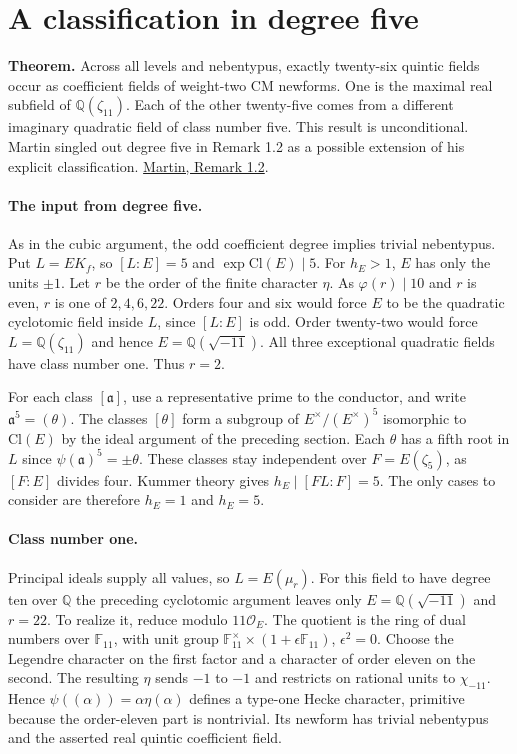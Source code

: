 \section{A classification in degree five}
\label{sec:quintic}

\textbf{Theorem.} Across all levels and nebentypus, exactly twenty-six
quintic fields occur as coefficient fields of weight-two CM newforms.
One is the maximal real subfield of $\mathbb Q(\zeta_{11})$. Each of
the other twenty-five comes from a different imaginary quadratic field
of class number five. This result is unconditional. Martin singled out
degree five in Remark 1.2 as a possible extension of his explicit
classification. \href{https://arxiv.org/pdf/2509.24119v2}{Martin, Remark 1.2}.

\paragraph{The input from degree five.}
As in the cubic argument, the odd coefficient degree implies trivial
nebentypus. Put $L=EK_f$, so $[L:E]=5$ and $\exp\mathrm{Cl}(E)\mid5$.
For $h_E>1$, $E$ has only the units $\pm1$.
Let $r$ be the order of the finite character $\eta$.
As $\varphi(r)\mid10$ and $r$ is even, $r$ is one of $2,4,6,22$.
Orders four and six would force $E$ to be the quadratic cyclotomic
field inside $L$, since $[L:E]$ is odd. Order twenty-two would
force $L=\mathbb Q(\zeta_{11})$ and hence $E=\mathbb Q(\sqrt{-11})$.
All three exceptional quadratic fields have class number one.
Thus $r=2$.

For each class $[\mathfrak a]$, use a representative prime to the
conductor, and write $\mathfrak a^5=(\theta)$. The classes $[\theta]$
form a subgroup of $E^\times/(E^\times)^5$ isomorphic to
$\mathrm{Cl}(E)$ by the ideal argument of the preceding section.
Each $\theta$ has a fifth root in $L$ since $\psi(\mathfrak a)^5=\pm\theta$.
These classes stay independent over $F=E(\zeta_5)$, as $[F:E]$ divides
four. Kummer theory gives $h_E\mid[FL:F]=5$. The only cases to
consider are therefore $h_E=1$ and $h_E=5$.

\paragraph{Class number one.}
Principal ideals supply all values, so $L=E(\mu_r)$.
For this field to have degree ten over $\mathbb Q$ the preceding
cyclotomic argument leaves only $E=\mathbb Q(\sqrt{-11})$ and
$r=22$. To realize it, reduce modulo $11\mathcal O_E$. The quotient
is the ring of dual numbers over $\mathbb F_{11}$, with unit group
$\mathbb F_{11}^\times\times(1+\epsilon\mathbb F_{11})$,
$\epsilon^2=0$. Choose the Legendre character on the first factor
and a character of order eleven on the second. The resulting
$\eta$ sends $-1$ to $-1$ and restricts on rational units to
$\chi_{-11}$. Hence $\psi((\alpha))=\alpha\eta(\alpha)$ defines a
type-one Hecke character, primitive because the order-eleven part
is nontrivial. Its newform has trivial nebentypus and the asserted
real quintic coefficient field.

